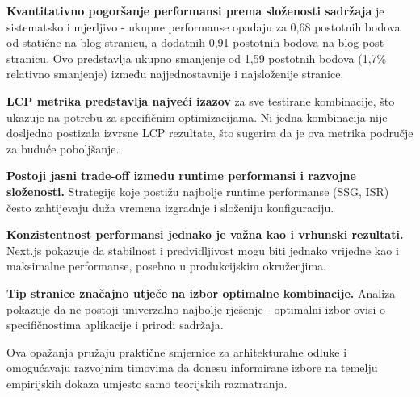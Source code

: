 \textbf{Kvantitativno pogoršanje performansi prema složenosti sadržaja} je sistematsko i mjerljivo - ukupne performanse opadaju za 0,68 postotnih bodova od statične na blog stranicu, a dodatnih 0,91 postotnih bodova na blog post stranicu. Ovo predstavlja ukupno smanjenje od 1,59 postotnih bodova (1,7\% relativno smanjenje) između najjednostavnije i najsloženije stranice.

\textbf{LCP metrika predstavlja najveći izazov} za sve testirane kombinacije, što ukazuje na potrebu za specifičnim optimizacijama. Ni jedna kombinacija nije dosljedno postizala izvrsne LCP rezultate, što sugerira da je ova metrika područje za buduće poboljšanje.

\textbf{Postoji jasni trade-off između runtime performansi i razvojne složenosti.} Strategije koje postižu najbolje runtime performanse (SSG, ISR) često zahtijevaju duža vremena izgradnje i složeniju konfiguraciju.

\textbf{Konzistentnost performansi jednako je važna kao i vrhunski rezultati.} Next.js pokazuje da stabilnost i predvidljivost mogu biti jednako vrijedne kao i maksimalne performanse, posebno u produkcijskim okruženjima.

\textbf{Tip stranice značajno utječe na izbor optimalne kombinacije.} Analiza pokazuje da ne postoji univerzalno najbolje rješenje - optimalni izbor ovisi o specifičnostima aplikacije i prirodi sadržaja.

Ova opažanja pružaju praktične smjernice za arhitekturalne odluke i omogućavaju razvojnim timovima da donesu informirane izbore na temelju empirijskih dokaza umjesto samo teorijskih razmatranja.
